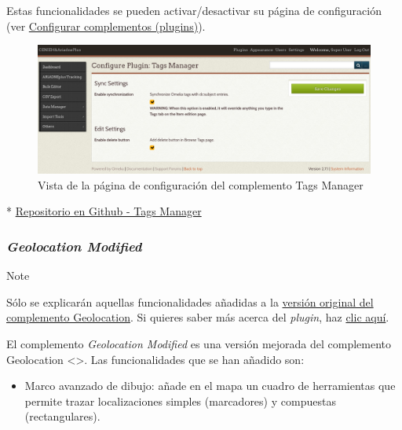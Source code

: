 \documentclass[
]{article}
\providecommand{\tightlist}{%
  \setlength{\itemsep}{0pt}\setlength{\parskip}{0pt}}
\begin{document}
Estas funcionalidades se pueden activar/desactivar su página de
configuración (ver
\protect\hyperlink{configurar-complementos-plugins}{Configurar
complementos (plugins)}).

\begin{figure}
\hypertarget{tags-manager}{%
\centering
\includegraphics{../_static/images/tags-manager.png}
\caption{Vista de la página de configuración del complemento Tags
Manager}\label{tags-manager}
}
\end{figure}

*
\href{https://github.com/gcm1001/TFG-CeniehAriadne/tree/master/omeka/plugins/TagsManager}{Repositorio
en Github - Tags Manager}

\hypertarget{geolocation-modified}{%
\subsubsection{\texorpdfstring{\emph{Geolocation
Modified}}{Geolocation Modified}}\label{geolocation-modified}}

Note

Sólo se explicarán aquellas funcionalidades añadidas a la
\href{https://omeka.org/classic/plugins/Geolocation/}{versión original
del complemento Geolocation}. Si quieres saber más acerca del
\emph{plugin}, haz
\href{https://omeka.org/classic/docs/Plugins/Geolocation/}{clic aquí}.

El complemento \emph{Geolocation Modified} es una versión mejorada del
complemento {Geolocation \textless\textgreater{}}. Las funcionalidades
que se han añadido son:

\begin{itemize}
\tightlist
\item
  Marco avanzado de dibujo: añade en el mapa un cuadro de herramientas
  que permite trazar localizaciones simples (marcadores) y compuestas
  (rectangulares).
\end{itemize}
\end{document}
